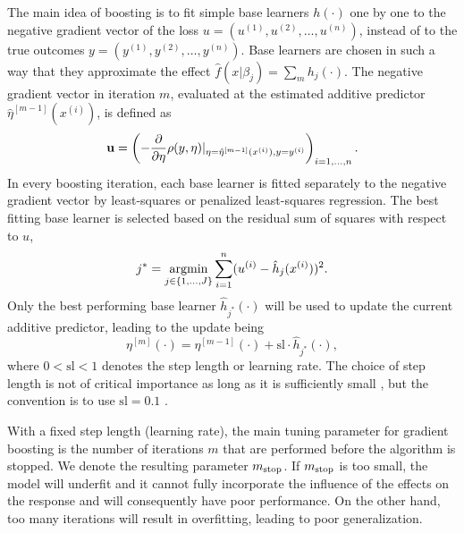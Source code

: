 The main idea of boosting is to fit simple base learners $h(\cdot)$ one by one to the negative gradient vector of the loss $u=(u^{(1)},u^{(2)},\ldots,u^{(n)})$, instead of to the true outcomes $y=(y^{(1)},y^{(2)},\ldots,y^{(n)})$. Base learners are chosen in such a way that they approximate the effect $\hat{f}(x|\beta_j)=\sum_mh_j(\cdot)$. The negative gradient vector in iteration $m$, evaluated at the estimated additive predictor $\hat{\eta}^{[m-1]}(x^{(i)})$, is defined as
\begin{equation*}
    \mathbf{u}=\left(-\frac{\partial}{\partial\eta}\rho(y,\eta)\rvert_{\eta=\hat{\eta}^{[m-1]}(x^{(i)}),y=y^{(i)}}\right)_{i=1,\ldots,n}.
\end{equation*}
In every boosting iteration, each base learner is fitted separately to the negative gradient vector by least-squares or penalized least-squares regression.
The best fitting base learner is selected based on the residual sum of squares with respect to $u$,
\begin{equation*}
    j^*=\operatorname*{argmin}_{j\in\{1,\ldots,J\}}\sum_{i=1}^{n}(u^{(i)}-\hat{h}_j(x^{(i)}))^2.
\end{equation*}
Only the best performing base learner $\hat{h}_{j^*}(\cdot)$ will be used to update the current additive predictor, leading to the update being
\begin{equation*}
    \eta^{[m]}(\cdot)=\eta^{[m-1]}(\cdot)+\text{sl}\cdot\hat{h}_{j^*}(\cdot),
\end{equation*}
where $0<\text{sl}<1$ denotes the step length or learning rate. The choice of step length is not of critical importance as long as it is sufficiently small \citep{schmid-hothorn}, but the convention is to use $\text{sl}=0.1$ \citep{mayr14a}.

With a fixed step length (learning rate), the main tuning parameter for gradient boosting is the number of iterations $m$ that are performed before the algorithm is stopped. We denote the resulting parameter $m_{\text{stop}}$. If $m_{\text{stop}}$ is too small, the model will underfit and it cannot fully incorporate the influence of the effects on the response and will consequently have poor performance. On the other hand, too many iterations will result in overfitting, leading to poor generalization.

